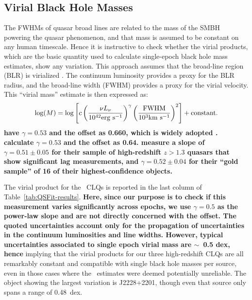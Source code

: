 \documentclass[fleqn,usenatbib]{mnras}
\begin{document}
\subsection{Virial Black Hole Masses}
\label{sec:BH_masses} 
The FWHMs of quasar broad lines are related to the mass of the SMBH
powering the quasar phenomenon, and that mass is assumed to be
constant on any human timescale.  Hence it is instructive to check
whether the virial products, which are the basic quantity used to
calculate single-epoch black hole mass estimates, show any
variation. This approach assumes that the broad-line region (BLR) is
virialized \citep[e.g.][]{Shen2011, Calderone2017}. The continuum
luminosity provides a proxy for the BLR radius, and the broad-line
width (FWHM) provides a proxy for the virial velocity.  This ``virial
mass'' estimate is then expressed as:
{\bf
\begin{equation}
    \log(M) = \log \left[c\left(  \frac{\nu L_\nu}{10^{42} {\rm erg\ s^{-1}}} \right)^{\gamma}  \left( \frac{\rm FWHM}{10^3 {\rm km\ s^{-1}}} \right)^2 \right] + {\rm constant}. 
\end{equation}
\citet{VestergaardPeterson2006} have $\gamma=0.53$ and the offset as 0.660, 
which is widely adopted \citep[e.g.,][]{Chen2019, Yao2019}.
\citet{Kozlowski2017} calculate $\gamma=0.53$ and the offset as 0.64. 
\citet{Grier2019} measure a slope of $\gamma=0.51\pm0.05$ for their sample of high-redshift
$z>1.3$ quasars that show significant lag measurements,
and  $\gamma=0.52\pm0.04$ for their ``gold sample'' of 16 of
their highest-confidence objects. }

The virial product for the \civ\
CLQs is reported in the last column of Table~\ref{tab:QSFit-results}.
{\bf Here, since our purpose is to check if this measurement varies significantly
across epochs, we use $\gamma=0.5$ as the power-law slope and
are not directly concerned with the offset.
 The quoted uncertainties account only for the propagation of uncertainties in the continuum luminosities and line widths.  However, typical uncertainties associated to single epoch virial mass are $\sim$~0.5 dex, hence} implying that the virial products for our three
high-redshift CLQs are all remarkably constant and compatible with
single black hole masses per source, even in those cases where the
\civ\ estimates were deemed potentially unreliable. The object showing
the largest variation is J2228+2201, though even that source only
spans a range of 0.48~dex.
\end{document}
